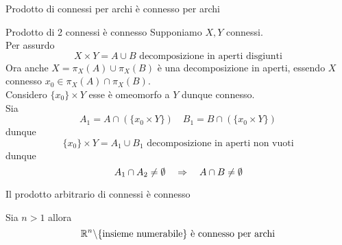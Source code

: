 \newpage
\begin{ex}Prodotto di connessi per archi \`e connesso per archi
\end{ex}
\begin{ex}Prodotto di 2 connessi \`e connesso 
\proof Supponiamo $X,Y$ connessi.\\
Per assurdo
$$ X \times Y = A \cup B\text{ decomposizione in aperti disgiunti}$$
Ora anche $X = \pi_X(A) \cup \pi_X(B)$ \`e una decomposizione in aperti, essendo $X$ connesso $x_0 \in \pi_X(A) \cap \pi_X(B)$.\\
Considero $\{x_0\} \times Y$ esse \`e omeomorfo a $Y$ dunque connesso.\\
Sia
$$ A_1= A \cap (\{ x_0 \times Y\}) \quad B_1= B \cap (\{ x_0 \times Y\})$$
dunque 
$$ \{ x_0 \} \times Y = A_1 \cup B_1 \text{ decomposizione in aperti non vuoti}$$
dunque $$A_1 \cap A_2 \neq \emptyset \quad \Rightarrow \quad A\cap B \neq \emptyset$$
\end{ex}
\begin{ex}Il prodotto arbitrario di connessi \`e connesso
\end{ex}
\begin{ex} Sia $n>1$ allora
$$\mathbb{R}^n \backslash\{ \text{insieme numerabile} \} \text{ \`e connesso per archi} $$
\end{ex}
